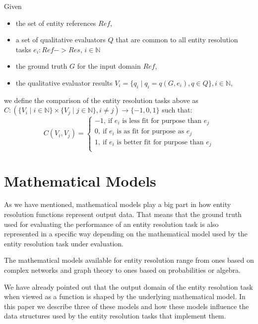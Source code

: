 \documentclass[11pt]{article}
\begin{document}
    \begin{defn}
        Given
        \begin{itemize}
            \item the set of entity references $Ref$,
            \item a set of qualitative evaluators $Q$ that are common to all
            entity resolution tasks $e_i : Ref -> Res$, $i \in \mathbb{N}$
            \item the ground truth $G$ for the input domain $Ref$,
            \item the qualitative evaluator results $V_i=\{q_{i} \mid q_{i} = q(G, e_i), q \in Q\},
            i \in \mathbb{N}$,
        \end{itemize}   
        we define the comparison of the entity resolution tasks above as
        $C : (
            \{V_i \mid i \in \mathbb{N}\}
            \times
            \{V_j \mid j \in \mathbb{N}\},
            i \neq j
        ) \rightarrow \{-1, 0, 1\}$ such that:
        \[ 
C(V_i, V_j) = \left\{
\begin{array}{ll}
      -1,~\textrm{if $e_i$ is less fit for purpose than $e_j$}\\
      0,~\textrm{if $e_i$ is as fit for purpose as $e_j$}\\
      1,~\textrm{if $e_i$ is better fit for purpose than $e_j$}\\
\end{array} 
\right. 
\]

    \end{defn}

    \section[mm]{Mathematical Models}\label{sec:mm}

    As we have mentioned, mathematical models play a big part in how entity
    resolution functions represent output data.
    That means that the ground truth used for evaluating the performance of an
    entity resolution task is also represented in a specific way depending on 
    the mathematical model used by the entity resolution task under evaluation.
    
    The mathematical models available for entity resolution range from ones
    based on complex networks and graph theory\cite{Li2020} to ones based on
    probabilities\cite{fs1969} or algebra\cite{Tal11,Ben2009Swoosh}.

    We have already pointed out that the output domain of the entity resolution
    task when viewed as a function is shaped by the underlying mathematical
    model.
    In this paper we describe three of these models and how these models
    influence the data structures used by the entity resolution tasks that
    implement them.
\end{document}
